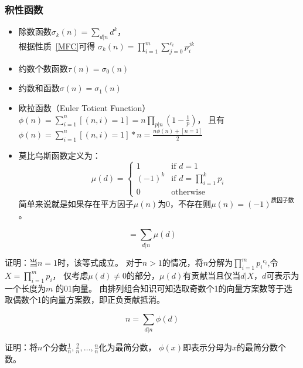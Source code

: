 \subsubsection{积性函数}
\begin{itemize}
	\item 除数函数$\displaystyle \sigma_k(n)=\sum_{d|n}{d^k}$，\\
	      根据性质~\ref{MFC}可得
	      $\displaystyle \sigma_k(n)=\prod_{i=1}^m{\sum_{j=0}^{c_i}{p_i^{jk}}}$
	\item 约数个数函数$\tau(n)=\sigma_0(n)$
	\item 约数和函数$\sigma(n)=\sigma_1(n)$
	\item {}
	      欧拉函数（Euler Totient Function）
	      $\displaystyle \phi(n)=\sum_{i=1}^n{[(n,i)=1]}=n\prod_{p|n}{(1-\frac{1}{p})}$，
	      且有$\displaystyle \phi(n)=\sum_{i=1}^n{[(n,i)=1]*n}=\frac{n\phi(n)+[n=1]}{2}$
	\item {}
	      莫比乌斯函数定义为：
	      \begin{displaymath}
		      \mu(d)=
		      \left\{
		      \begin{array}{ll}
			      1      & \textrm{if $d=1$}                                \\
			      (-1)^k & \textrm{if $\displaystyle d=\prod_{i=1}^k{p_i}$} \\
			      0      & \textrm{otherwise}
		      \end{array}
		      \right.
	      \end{displaymath}
	      简单来说就是如果存在平方因子$\mu(n)$为0，不存在则$\mu(n)=(-1)^\textrm{质因子数}$。
\end{itemize}
\begin{theorem}\label{MobiusT}
	\begin{displaymath}
		[n=1]=\sum_{d|n}{\mu(d)}
	\end{displaymath}
\end{theorem}
证明：当$n=1$时，该等式成立。
对于$n>1$的情况，将$n$分解为$\displaystyle \prod_{i=1}^m{{p_i}^{c_i}}$,令
$\displaystyle X=\prod_{i=1}^m{p_i}$，
仅考虑$\mu(d)\neq 0$的部分，$\mu(d)$有贡献当且仅当$d|X$，$d$可表示为一个长度为$m$
的01向量。
由排列组合知识可知选取奇数个1的向量方案数等于选取偶数个1的向量方案数，即正负贡献抵消。
\begin{theorem}\label{PhiT}
	\begin{displaymath}
		n=\sum_{d|n}{\phi(d)}
	\end{displaymath}
\end{theorem}
证明：将$n$个分数$\frac{1}{n},\frac{2}{n},\ldots,\frac{n}{n}$化为最简分数，
$\phi(x)$即表示分母为$x$的最简分数个数。

